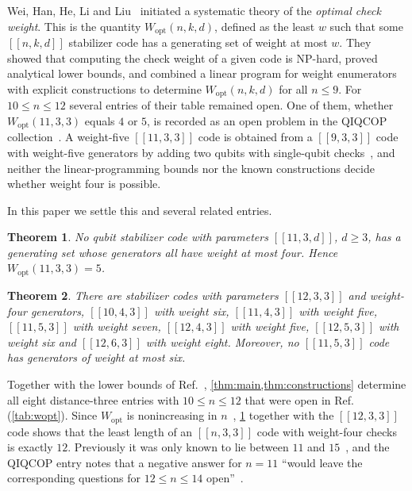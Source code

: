 \documentclass[a4paper,onecolumn,unpublished]{quantumarticle}
\newtheorem{theorem}{Theorem}
\theoremstyle{definition}
\theoremstyle{remark}
\newcommand{\Wopt}{W_{\mathrm{opt}}}
\newcommand{\qc}[1]{[\![#1]\!]}
\begin{document}
Wei, Han, He, Li and Liu~\cite{WHHLL26} initiated a systematic theory of the \emph{optimal check
weight}. This is the quantity $\Wopt(n,k,d)$, defined as the least $w$ such that some $\qc{n,k,d}$ stabilizer code has a generating
set of weight at most $w$. They showed that computing the check weight of a given code is NP-hard,
proved analytical lower bounds, and combined a linear program for weight enumerators with explicit
constructions to determine $\Wopt(n,k,d)$ for all $n\le9$. For $10\le n\le12$ several entries of
their table remained open. One of them, whether $\Wopt(11,3,3)$ equals $4$ or $5$, is recorded as an open problem
in the QIQCOP collection~\cite{QIQCOP}. A weight-five $\qc{11,3,3}$ code is obtained from a
$\qc{9,3,3}$ code with weight-five generators by adding two qubits with single-qubit
checks~\cite{WHHLL26}, and neither the linear-programming bounds nor the known constructions decide
whether weight four is possible.

In this paper we settle this and several related entries.

\begin{theorem}
\label{thm:main}
No qubit stabilizer code with parameters $\qc{11,3,d}$, $d\ge3$, has a generating set whose
generators all have weight at most four. Hence $\Wopt(11,3,3)=5$.
\end{theorem}

\begin{theorem}
\label{thm:constructions}
There are stabilizer codes with parameters $\qc{12,3,3}$ and weight-four generators,
$\qc{10,4,3}$ with weight six, $\qc{11,4,3}$ with weight five, $\qc{11,5,3}$ with weight seven,
$\qc{12,4,3}$ with weight five, $\qc{12,5,3}$ with weight six and $\qc{12,6,3}$ with weight
eight. Moreover, no $\qc{11,5,3}$ code has generators of weight at most six.
\end{theorem}

Together with the lower bounds of Ref.~\cite{WHHLL26}, \cref{thm:main,thm:constructions}
determine all eight distance-three entries with $10\le n\le12$ that were open in
Ref.~\cite{WHHLL26} (\cref{tab:wopt}). Since $\Wopt$ is nonincreasing in $n$~\cite{WHHLL26},
\cref{thm:main} together with the $\qc{12,3,3}$ code shows that the least length of an
$\qc{n,3,3}$ code with weight-four checks is exactly $12$. Previously it was only known to lie
between $11$ and $15$~\cite{WHHLL26}, and the QIQCOP entry notes that a negative answer for
$n=11$ ``would leave the corresponding questions for $12\le n\le14$ open''~\cite{QIQCOP}.
\end{document}
